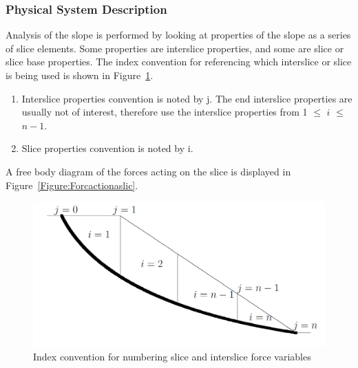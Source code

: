 \documentclass[12pt]{article}
\begin{document}
\subsubsection{Physical System Description}
\label{Sec:PhysSystDesc}
Analysis of the slope is performed by looking at properties of the slope as a series of slice elements. Some properties are interslice properties, and some are slice or slice base properties. The index convention for referencing which interslice or slice is being used is shown in Figure~\ref{Figure:Indeconvfornumbslicandinteforcvaris}.
\begin{enumerate}
\item{Interslice properties convention is noted by j. The end interslice properties are usually not of interest, therefore use the interslice properties from 1 $\leq{}$ $i$ $\leq{}$ $n-1$.}
\item{Slice properties convention is noted by i.}
\end{enumerate}
A free body diagram of the forces acting on the slice is displayed in Figure~\ref{Figure:Forcactionaslic}.
\begin{figure}
\begin{center}
\includegraphics{IndexConvention.png}
\caption{Index convention for numbering slice and interslice force variables}
\label{Figure:Indeconvfornumbslicandinteforcvaris}
\end{center}
\end{figure}
\end{document}
